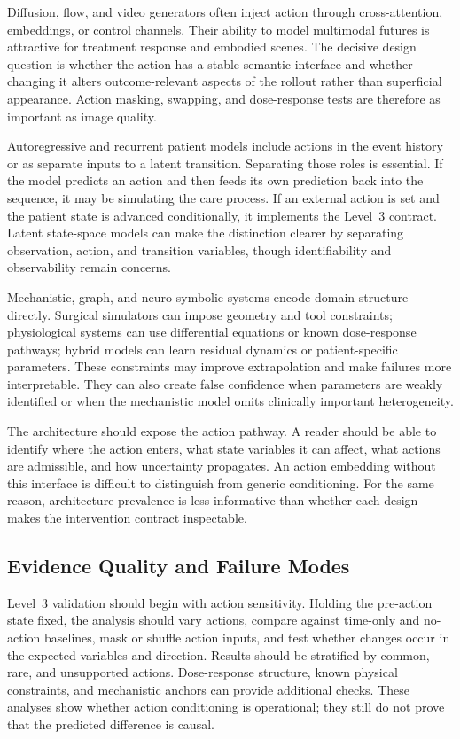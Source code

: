 Diffusion, flow, and video generators often inject action through cross-attention, embeddings, or control channels. Their ability to model multimodal futures is attractive for treatment response and embodied scenes. The decisive design question is whether the action has a stable semantic interface and whether changing it alters outcome-relevant aspects of the rollout rather than superficial appearance. Action masking, swapping, and dose-response tests are therefore as important as image quality.

Autoregressive and recurrent patient models include actions in the event history or as separate inputs to a latent transition. Separating those roles is essential. If the model predicts an action and then feeds its own prediction back into the sequence, it may be simulating the care process. If an external action is set and the patient state is advanced conditionally, it implements the Level~3 contract. Latent state-space models can make the distinction clearer by separating observation, action, and transition variables, though identifiability and observability remain concerns.

Mechanistic, graph, and neuro-symbolic systems encode domain structure directly. Surgical simulators can impose geometry and tool constraints; physiological systems can use differential equations or known dose-response pathways; hybrid models can learn residual dynamics or patient-specific parameters. These constraints may improve extrapolation and make failures more interpretable. They can also create false confidence when parameters are weakly identified or when the mechanistic model omits clinically important heterogeneity.

The architecture should expose the action pathway. A reader should be able to identify where the action enters, what state variables it can affect, what actions are admissible, and how uncertainty propagates. An action embedding without this interface is difficult to distinguish from generic conditioning. For the same reason, architecture prevalence is less informative than whether each design makes the intervention contract inspectable.

\subsection{Evidence Quality and Failure Modes}

Level~3 validation should begin with action sensitivity. Holding the pre-action state fixed, the analysis should vary actions, compare against time-only and no-action baselines, mask or shuffle action inputs, and test whether changes occur in the expected variables and direction. Results should be stratified by common, rare, and unsupported actions. Dose-response structure, known physical constraints, and mechanistic anchors can provide additional checks. These analyses show whether action conditioning is operational; they still do not prove that the predicted difference is causal.

